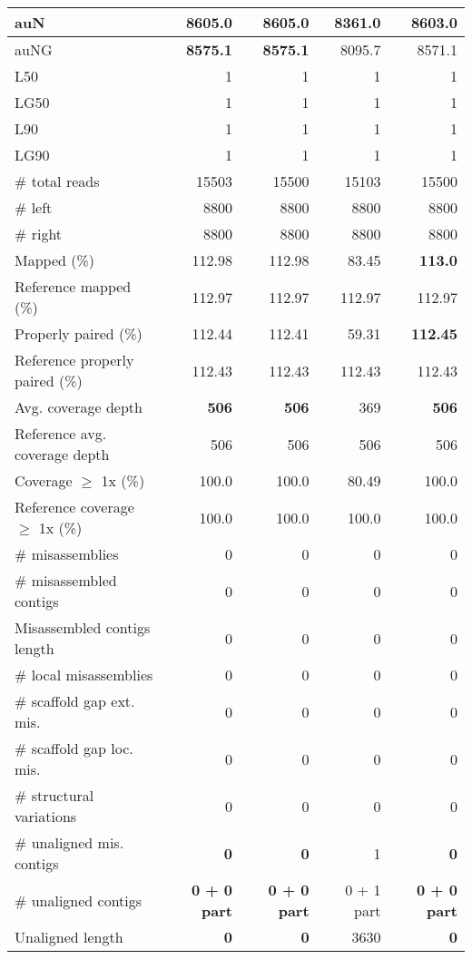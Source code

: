 \documentclass[12pt,a4paper]{article}
\begin{document}
\begin{table}[ht]
\begin{center}
\begin{tabular}{|l*{4}{|r}|}
auN & {\bf 8605.0} & {\bf 8605.0} & 8361.0 & 8603.0 \\ \hline
auNG & {\bf 8575.1} & {\bf 8575.1} & 8095.7 & 8571.1 \\ \hline
L50 & 1 & 1 & 1 & 1 \\ \hline
LG50 & 1 & 1 & 1 & 1 \\ \hline
L90 & 1 & 1 & 1 & 1 \\ \hline
LG90 & 1 & 1 & 1 & 1 \\ \hline
\# total reads & 15503 & 15500 & 15103 & 15500 \\ \hline
\# left & 8800 & 8800 & 8800 & 8800 \\ \hline
\# right & 8800 & 8800 & 8800 & 8800 \\ \hline
Mapped (\%) & 112.98 & 112.98 & 83.45 & {\bf 113.0} \\ \hline
Reference mapped (\%) & 112.97 & 112.97 & 112.97 & 112.97 \\ \hline
Properly paired (\%) & 112.44 & 112.41 & 59.31 & {\bf 112.45} \\ \hline
Reference properly paired (\%) & 112.43 & 112.43 & 112.43 & 112.43 \\ \hline
Avg. coverage depth & {\bf 506} & {\bf 506} & 369 & {\bf 506} \\ \hline
Reference avg. coverage depth & 506 & 506 & 506 & 506 \\ \hline
Coverage $\geq$ 1x (\%) & 100.0 & 100.0 & 80.49 & 100.0 \\ \hline
Reference coverage $\geq$ 1x (\%) & 100.0 & 100.0 & 100.0 & 100.0 \\ \hline
\# misassemblies & 0 & 0 & 0 & 0 \\ \hline
\# misassembled contigs & 0 & 0 & 0 & 0 \\ \hline
Misassembled contigs length & 0 & 0 & 0 & 0 \\ \hline
\# local misassemblies & 0 & 0 & 0 & 0 \\ \hline
\# scaffold gap ext. mis. & 0 & 0 & 0 & 0 \\ \hline
\# scaffold gap loc. mis. & 0 & 0 & 0 & 0 \\ \hline
\# structural variations & 0 & 0 & 0 & 0 \\ \hline
\# unaligned mis. contigs & {\bf 0} & {\bf 0} & 1 & {\bf 0} \\ \hline
\# unaligned contigs & {\bf 0 + 0 part} & {\bf 0 + 0 part} & 0 + 1 part & {\bf 0 + 0 part} \\ \hline
Unaligned length & {\bf 0} & {\bf 0} & 3630 & {\bf 0} \\ \hline

\end{tabular}
\end{center}
\end{table}
\end{document}
